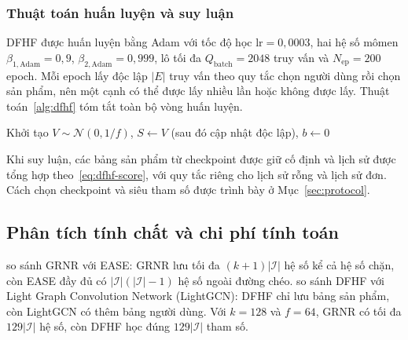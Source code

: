 \subsubsection{Thuật toán huấn luyện và suy luận}
\label{sec:dfhf-algorithm}

DFHF được huấn luyện bằng Adam với tốc độ học $\mathrm{lr}=0{,}0003$, hai hệ số mômen $\beta_{1,\mathrm{Adam}}=0{,}9$, $\beta_{2,\mathrm{Adam}}=0{,}999$, lô tối đa $Q_{\mathrm{batch}}=2048$ truy vấn và $N_{\mathrm{ep}}=200$ epoch. Mỗi epoch lấy độc lập $|E|$ truy vấn theo quy tắc chọn người dùng rồi chọn sản phẩm, nên một cạnh có thể được lấy nhiều lần hoặc không được lấy. Thuật toán~\ref{alg:dfhf} tóm tắt toàn bộ vòng huấn luyện.

\begingroup
\setlength{\intextsep}{6pt}
\begin{algorithm}[H]
\caption{Huấn luyện DFHF}
\label{alg:dfhf}
Khởi tạo $V\sim\mathcal{N}(0,1/f)$, $S\leftarrow V$ (sau đó cập nhật độc lập), $b\leftarrow0$\;
\end{algorithm}

Khi suy luận, các bảng sản phẩm từ checkpoint được giữ cố định và lịch sử được tổng hợp theo~\eqref{eq:dfhf-score}, với quy tắc riêng cho lịch sử rỗng và lịch sử đơn. Cách chọn checkpoint và siêu tham số được trình bày ở Mục~\ref{sec:protocol}.

\endgroup

\subsection{Phân tích tính chất và chi phí tính toán}
\label{sec:complexity}

 so sánh GRNR với EASE: GRNR lưu tối đa $(k+1)|\mathcal{I}|$ hệ số kể cả hệ số chặn, còn EASE đầy đủ có $|\mathcal{I}|(|\mathcal{I}|-1)$ hệ số ngoài đường chéo.  so sánh DFHF với Light Graph Convolution Network (LightGCN): DFHF chỉ lưu bảng sản phẩm, còn LightGCN có thêm bảng người dùng. Với $k=128$ và $f=64$, GRNR có tối đa $129|\mathcal{I}|$ hệ số, còn DFHF học đúng $129|\mathcal{I}|$ tham số.

